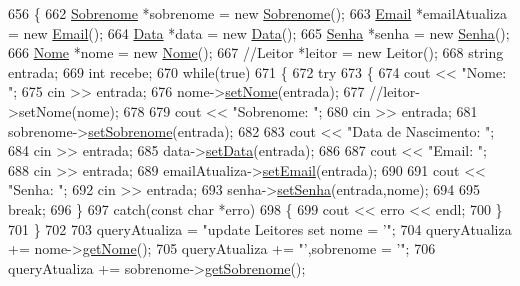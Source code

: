 \begin{DoxyCode}
656 \{
662   \mbox{\hyperlink{class_sobrenome}{Sobrenome}} *sobrenome = \textcolor{keyword}{new} \mbox{\hyperlink{class_sobrenome}{Sobrenome}}();
663   \mbox{\hyperlink{class_email}{Email}} *emailAtualiza = \textcolor{keyword}{new} \mbox{\hyperlink{class_email}{Email}}();
664   \mbox{\hyperlink{class_data}{Data}} *data = \textcolor{keyword}{new} \mbox{\hyperlink{class_data}{Data}}();
665   \mbox{\hyperlink{class_senha}{Senha}} *senha = \textcolor{keyword}{new} \mbox{\hyperlink{class_senha}{Senha}}();
666   \mbox{\hyperlink{class_nome}{Nome}} *nome = \textcolor{keyword}{new} \mbox{\hyperlink{class_nome}{Nome}}();
667   \textcolor{comment}{//Leitor *leitor = new Leitor();}
668   \textcolor{keywordtype}{string} entrada;
669   \textcolor{keywordtype}{int} recebe;
670   \textcolor{keywordflow}{while}(\textcolor{keyword}{true})
671   \{
672       \textcolor{keywordflow}{try}
673       \{
674         cout << \textcolor{stringliteral}{"Nome: "};
675         cin >> entrada;
676         nome->\mbox{\hyperlink{class_nome_a83b9f56ec9f86f4b976846f4c5c65b30}{setNome}}(entrada);
677         \textcolor{comment}{//leitor->setNome(nome);}
678 
679         cout << \textcolor{stringliteral}{"Sobrenome: "};
680         cin >> entrada;
681         sobrenome->\mbox{\hyperlink{class_sobrenome_a9dc2277e3600656838e47c86dfddd23a}{setSobrenome}}(entrada);
682 
683         cout << \textcolor{stringliteral}{"Data de Nascimento: "};
684         cin >> entrada;
685         data->\mbox{\hyperlink{class_data_a5245638838a033c98a8b760836dddb7d}{setData}}(entrada);
686 
687         cout << \textcolor{stringliteral}{"Email: "};
688         cin >> entrada;
689         emailAtualiza->\mbox{\hyperlink{class_email_a2614b3a19d961411d1bece9c1bdf616f}{setEmail}}(entrada);
690 
691         cout << \textcolor{stringliteral}{"Senha: "};
692         cin >> entrada;
693         senha->\mbox{\hyperlink{class_senha_a01bbc2a82c5f405b68f33fe0dc538ec1}{setSenha}}(entrada,nome);
694 
695         \textcolor{keywordflow}{break};
696       \}
697       \textcolor{keywordflow}{catch}(\textcolor{keyword}{const} \textcolor{keywordtype}{char} *erro)
698       \{
699         cout << erro << endl;
700       \}
701     \}
702 
703   queryAtualiza = \textcolor{stringliteral}{"update Leitores set nome = '"};
704   queryAtualiza += nome->\mbox{\hyperlink{class_nome_aad41176173eec20cbbae1576447a3697}{getNome}}();
705   queryAtualiza += \textcolor{stringliteral}{"',sobrenome = '"};
706   queryAtualiza += sobrenome->\mbox{\hyperlink{class_sobrenome_a954491366ce07f6715f32a97d67edf04}{getSobrenome}}();

\end{DoxyCode}

